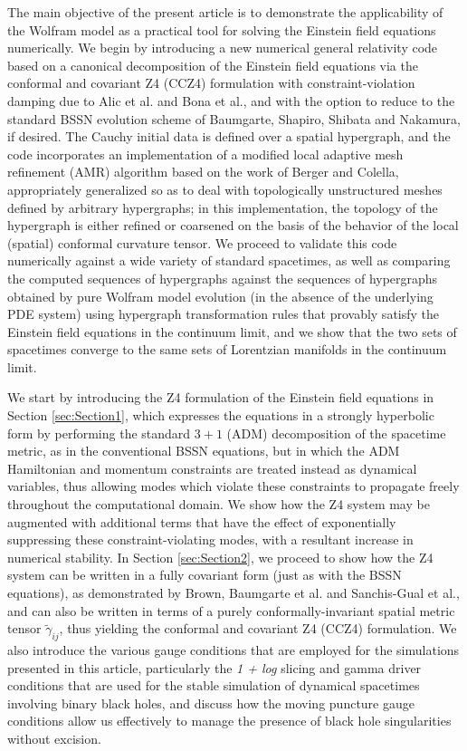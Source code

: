 \documentclass{article}
\begin{document}
The main objective of the present article is to demonstrate the applicability of the Wolfram model as a practical tool for solving the Einstein field equations numerically. We begin by introducing a new numerical general relativity code based on a canonical decomposition of the Einstein field equations via the conformal and covariant Z4 (CCZ4) formulation with constraint-violation damping due to Alic et al.\cite{alic} and Bona et al.\cite{bona}, and with the option to reduce to the standard BSSN evolution scheme of Baumgarte, Shapiro, Shibata and Nakamura\cite{baumgarte}\cite{shibata}, if desired. The Cauchy initial data is defined over a spatial hypergraph, and the code incorporates an implementation of a modified local adaptive mesh refinement (AMR) algorithm based on the work of Berger and Colella, appropriately generalized so as to deal with topologically unstructured meshes defined by arbitrary hypergraphs; in this implementation, the topology of the hypergraph is either refined or coarsened on the basis of the behavior of the local (spatial) conformal curvature tensor. We proceed to validate this code numerically against a wide variety of standard spacetimes, as well as comparing the computed sequences of hypergraphs against the sequences of hypergraphs obtained by pure Wolfram model evolution (in the absence of the underlying PDE system) using hypergraph transformation rules that provably satisfy the Einstein field equations in the continuum limit, and we show that the two sets of spacetimes converge to the same sets of Lorentzian manifolds in the continuum limit.

We start by introducing the Z4 formulation of the Einstein field equations in Section \ref{sec:Section1}, which expresses the equations in a strongly hyperbolic form by performing the standard ${3 + 1}$ (ADM\cite{arnowitt}) decomposition of the spacetime metric, as in the conventional BSSN equations, but in which the ADM Hamiltonian and momentum constraints are treated instead as dynamical variables, thus allowing modes which violate these constraints to propagate freely throughout the computational domain. We show how the Z4 system may be augmented with additional terms that have the effect of exponentially suppressing these constraint-violating modes, with a resultant increase in numerical stability. In Section \ref{sec:Section2}, we proceed to show how the Z4 system can be written in a fully covariant form (just as with the BSSN equations), as demonstrated by Brown\cite{brown}, Baumgarte et al.\cite{baumgarte2} and Sanchis-Gual et al.\cite{sanchisgual}, and can also be written in terms of a purely conformally-invariant spatial metric tensor ${\tilde{\gamma}_{i j}}$, thus yielding the conformal and covariant Z4 (CCZ4) formulation. We also introduce the various gauge conditions that are employed for the simulations presented in this article, particularly the \textit{1 + log} slicing and gamma driver conditions that are used for the stable simulation of dynamical spacetimes involving binary black holes, and discuss how the moving puncture gauge conditions allow us effectively to manage the presence of black hole singularities without excision.
\end{document}
